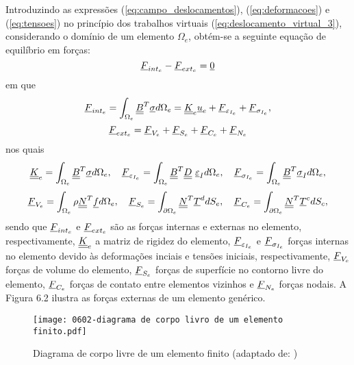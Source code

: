 Introduzindo as expressões (\ref{eq:campo_deslocamentos}), (\ref{eq:deformacoes}) e (\ref{eq:tensoes}) no princípio dos trabalhos virtuais (\ref{eq:deslocamento_virtual_3}), considerando o domínio de um elemento $\Omega_e$, obtém-se a seguinte equação de equilíbrio em forças:
\begin{equation}
	\label{eq:forcas_interna_externa}
	\underline{F}_{int_e} - \underline{F}_{ext_e} = \underline 0
\end{equation}
em que
\begin{equation}
	\label{eq:forca_interna}
	\underline{F}_{int_e} = \int_{\Omega_e} \underline{\underline B}^T \underline \sigma d\Omega_e = \underline{\underline K}_e \underline u_e + \underline{F}_{\varepsilon_{I_e}} + \underline{F}_{\sigma_{I_e}},
\end{equation}
\begin{equation}
	\label{eq:forca_externa}
	\underline{F}_{ext_e} = \underline{F}_{V_e} + \underline{F}_{S_e} + \underline{F}_{C_e} + \underline{F}_{N_e}
\end{equation}
nos quais
\begin{equation}
	\label{eq:elementos_forca_interna}
	\underline{\underline K}_e = \int_{\Omega_e} \underline{\underline B}^T \underline \sigma d\Omega_e,~~~ \underline{F}_{\varepsilon_{I_e}} = \int_{\Omega_e} \underline{\underline B}^T \underline{\underline D}~ \underline{\varepsilon}_I d\Omega_e,~~~ \underline{F}_{\sigma_{I_e}} = \int_{\Omega_e} \underline{\underline B}^T \underline \sigma_I d\Omega_e,
\end{equation}
\begin{equation}
	\label{eq:elementos_forca_externa}
	\underline{F}_{V_e} = \int_{\Omega_e} \rho \underline{\underline N}^T \underline f d\Omega_e,~~~ \underline{F}_{S_e} = \int_{\partial \Omega_e} \underline{\underline N}^T \underline T^d dS_e,~~~
	\underline{F}_{C_e} = \int_{\partial \Omega_{e}} \underline{\underline N}^T \underline T^c dS_c,
\end{equation}
sendo que $\underline{F}_{int_e}$ e $\underline{F}_{ext_e}$ são as forças internas e externas no elemento, respectivamente, $\underline{\underline K}_e$ a matriz de rigidez do elemento, $\underline{F}_{\varepsilon_{I_e}}$ e $\underline{F}_{\sigma_{I_e}}$  forças internas no elemento devido às deformações inciais e tensões iniciais, respectivamente, $\underline{F}_{V_e}$ forças de volume do elemento, $\underline{F}_{S_e}$ forças de superfície no contorno livre do elemento, $\underline{F}_{C_e}$ forças de contato entre elementos vizinhos e $\underline{F}_{N_e}$  forças nodais. A Figura 6.2 ilustra as forças externas de um elemento genérico.
\begin{figure}[H]
	\begin{center}
		\texttt{[image: 0602-diagrama de corpo livro de um elemento finito.pdf]}
	\end{center}
	\caption{\label{discretizacao_MEF}Diagrama de corpo livre de um elemento finito (adaptado de: )}
\end{figure}
